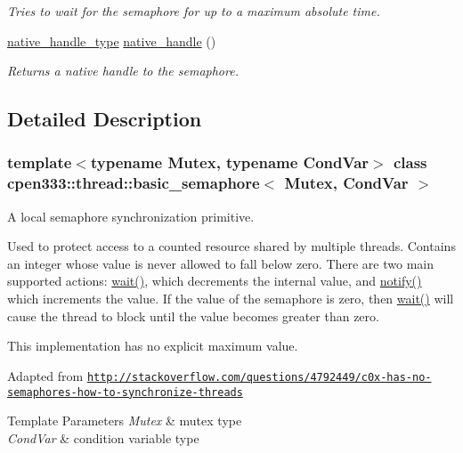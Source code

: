 \begin{DoxyCompactItemize}
\begin{DoxyCompactList}\small\item\em Tries to wait for the semaphore for up to a maximum absolute time. \end{DoxyCompactList}\item 
\hyperlink{classcpen333_1_1thread_1_1basic__semaphore_a15d9956adddf81d3a39aea36c6c0fd18}{native\+\_\+handle\+\_\+type} \hyperlink{classcpen333_1_1thread_1_1basic__semaphore_a3c3cd804e1aaa10f414820867f2e3798}{native\+\_\+handle} ()
\begin{DoxyCompactList}\small\item\em Returns a native handle to the semaphore. \end{DoxyCompactList}\end{DoxyCompactItemize}


\subsection{Detailed Description}
\subsubsection*{template$<$typename Mutex, typename Cond\+Var$>$\newline
class cpen333\+::thread\+::basic\+\_\+semaphore$<$ Mutex, Cond\+Var $>$}

A local semaphore synchronization primitive. 

Used to protect access to a counted resource shared by multiple threads. Contains an integer whose value is never allowed to fall below zero. There are two main supported actions\+: \hyperlink{classcpen333_1_1thread_1_1basic__semaphore_ac5cacef970643d393429ff87c0c6d6bf}{wait()}, which decrements the internal value, and \hyperlink{classcpen333_1_1thread_1_1basic__semaphore_a0b5032fc8df915cb51276411b1153b84}{notify()} which increments the value. If the value of the semaphore is zero, then \hyperlink{classcpen333_1_1thread_1_1basic__semaphore_ac5cacef970643d393429ff87c0c6d6bf}{wait()} will cause the thread to block until the value becomes greater than zero.

This implementation has no explicit maximum value.

Adapted from \href{http://stackoverflow.com/questions/4792449/c0x-has-no-semaphores-how-to-synchronize-threads}{\tt http\+://stackoverflow.\+com/questions/4792449/c0x-\/has-\/no-\/semaphores-\/how-\/to-\/synchronize-\/threads}


\begin{DoxyTemplParams}{Template Parameters}
{\em Mutex} & mutex type \\
\hline
{\em Cond\+Var} & condition variable type \\
\hline
\end{DoxyTemplParams}


